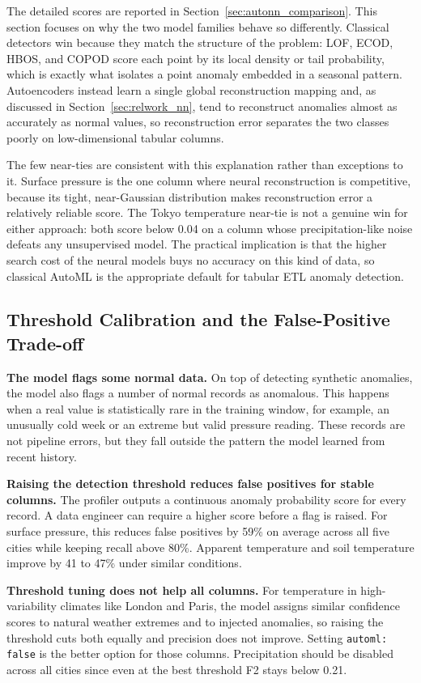 \documentclass[12pt]{article}
\begin{document}
The detailed scores are reported in Section~\ref{sec:autonn_comparison}. This section focuses on why the two model families behave so differently. Classical detectors win because they match the structure of the problem: LOF, ECOD, HBOS, and COPOD score each point by its local density or tail probability, which is exactly what isolates a point anomaly embedded in a seasonal pattern. Autoencoders instead learn a single global reconstruction mapping and, as discussed in Section~\ref{sec:relwork_nn}, tend to reconstruct anomalies almost as accurately as normal values, so reconstruction error separates the two classes poorly on low-dimensional tabular columns.

The few near-ties are consistent with this explanation rather than exceptions to it. Surface pressure is the one column where neural reconstruction is competitive, because its tight, near-Gaussian distribution makes reconstruction error a relatively reliable score. The Tokyo temperature near-tie is not a genuine win for either approach: both score below 0.04 on a column whose precipitation-like noise defeats any unsupervised model. The practical implication is that the higher search cost of the neural models buys no accuracy on this kind of data, so classical AutoML is the appropriate default for tabular ETL anomaly detection.

\subsection{Threshold Calibration and the False-Positive Trade-off}

\textbf{The model flags some normal data.} On top of detecting synthetic anomalies, the model also flags a number of normal records as anomalous. This happens when a real value is statistically rare in the training window, for example, an unusually cold week or an extreme but valid pressure reading. These records are not pipeline errors, but they fall outside the pattern the model learned from recent history.

\textbf{Raising the detection threshold reduces false positives for stable columns.} The profiler outputs a continuous anomaly probability score for every record. A data engineer can require a higher score before a flag is raised. For surface pressure, this reduces false positives by 59\% on average across all five cities while keeping recall above 80\%. Apparent temperature and soil temperature improve by 41 to 47\% under similar conditions.

\textbf{Threshold tuning does not help all columns.} For temperature in high-variability climates like London and Paris, the model assigns similar confidence scores to natural weather extremes and to injected anomalies, so raising the threshold cuts both equally and precision does not improve. Setting \texttt{automl: false} is the better option for those columns. Precipitation should be disabled across all cities since even at the best threshold F2 stays below 0.21.
\end{document}
